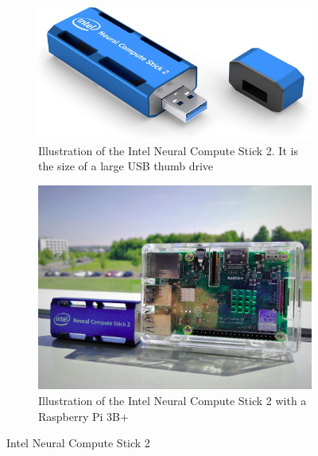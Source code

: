 \documentclass[../Head/Main.tex]{subfiles}
\begin{document}
\begin{figure}[H]
    \centering
    \begin{subfigure}{0.49\textwidth}
        \vspace{25pt}
        \includegraphics[width=\textwidth]{../Figures/Intel_NCS2.jpg}
        \vspace{25pt}
        \caption{Illustration of the Intel Neural Compute Stick 2. It is the size of a large USB thumb drive \cite{Intel_NCS2_IMG}}
        \label{fig:NCS2}        
    \end{subfigure}
    \hfill
    \begin{subfigure}{0.49\textwidth}
        \includegraphics[width=\textwidth]{../Figures/Intel_NCS2_RPi.png}
        \caption{Illustration of the Intel Neural Compute Stick 2 with a Raspberry Pi 3B+ \cite{Intel_NCS2_IMG_RPi}}
        \label{fig:NCS2_RPi}        
    \end{subfigure}
    \caption{Intel Neural Compute Stick 2}
    \label{fig:Intel_NCS2}
\end{figure}
\end{document}
